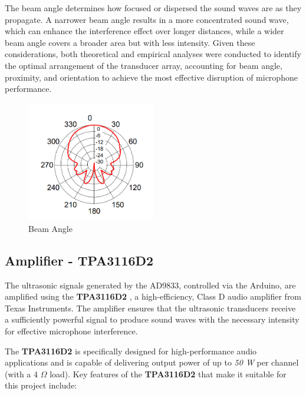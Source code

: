The beam angle determines how focused or dispersed the sound waves are as they propagate. A narrower beam angle results in a more concentrated sound wave, which can enhance the interference effect over longer distances, while a wider beam angle covers a broader area but with less intensity. Given these considerations, both theoretical and empirical analyses were conducted to identify the optimal arrangement of the transducer array, accounting for beam angle, proximity, and orientation to achieve the most effective disruption of microphone performance.
\begin{figure}[h!]
    \centering
    \includegraphics[width=0.5\textwidth]{images/Beam_Angle.png}
    \caption{Beam Angle}
    \label{fig:transducer_shape}
\end{figure}

\subsection{Amplifier - TPA3116D2}

The ultrasonic signals generated by the AD9833, controlled via the Arduino, are amplified using the \textbf{TPA3116D2} \cite{tpa3116d2}, a high-efficiency, Class D audio amplifier from Texas Instruments. The amplifier ensures that the ultrasonic transducers receive a sufficiently powerful signal to produce sound waves with the necessary intensity for effective microphone interference.

The \textbf{TPA3116D2} is specifically designed for high-performance audio applications and is capable of delivering output power of up to \textit{50 W} per channel (with a 4 $\Omega$ load). Key features of the \textbf{TPA3116D2} that make it suitable for this project include:

